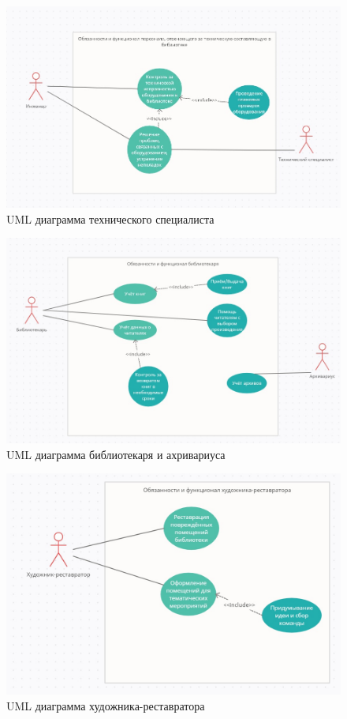 \documentclass[14pt]{extreport}
\begin{document}
\begin{figure}[h!]
\centering
\includegraphics[width=1\linewidth]{techic.png}
\caption{UML диаграмма технического специалиста}
\end{figure}

\begin{figure}[h!]
\centering
\includegraphics[width=1\linewidth]{libr.png}
\caption{UML диаграмма библиотекаря и ахривариуса}
\end{figure}

\begin{figure}[h!]
\centering
\includegraphics[width=1\linewidth]{art.png}
\caption{UML диаграмма художника-реставратора}
\end{figure}
\end{document}
